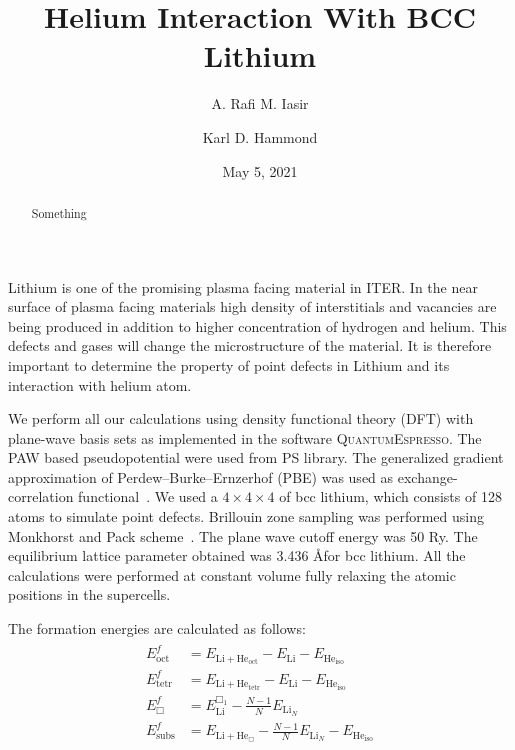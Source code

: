 \documentclass[aps,prl,amsmath,amssymb,reprint]{revtex4-1}
\begin{document}
\title{Helium Interaction With BCC Lithium}
\author{A. Rafi M. Iasir}
\author{Karl D. Hammond}
\date{May 5, 2021}

\begin{abstract}
Something
\end{abstract}


\maketitle
Lithium is one of the promising plasma facing material in ITER. In the near surface of plasma facing materials high density of interstitials and vacancies are being produced in addition to higher concentration of hydrogen and helium. This defects and gases will change the microstructure of the material. It is therefore important to determine the property of point defects in Lithium and its interaction with helium atom.

We perform all our calculations using density functional theory (DFT) with plane-wave basis sets as implemented in the software \textsc{QuantumEspresso}\cite{}. The PAW based pseudopotential were used from PS library. The generalized gradient approximation of Perdew--Burke--Ernzerhof (PBE) was used as exchange-correlation functional~\cite{}. We used a $4\times4\times4$ of bcc lithium, which consists of 128 atoms to simulate point defects. Brillouin zone sampling was performed using Monkhorst and Pack scheme~\cite{}. The plane wave cutoff energy was 50 Ry. The equilibrium lattice parameter obtained was 3.436 \AA\@ for bcc lithium. All the calculations were performed at constant volume fully relaxing the atomic positions in the supercells.

The formation energies are calculated as follows:
\begin{align}\label{eq_forme}
\begin{split}
 E^{f}_{\text{oct}} & = E_{\text{Li}+\text{He}_{\text{oct}}} - E_{\text{Li}} - E_{\text{He}_{\text{iso}}} \\
 E^{f}_{\text{tetr}}& = E_{\text{Li}+\text{He}_{\text{tetr}}} - E_{\text{Li}} - E_{\text{He}_{\text{iso}}} \\
 E^f_{\Box} & = E^{{\Box}_1}_{\text{Li}} - \frac{N-1}{N} E_{\text{Li}_N} \\
 E^f_{\text{subs}} & = E_{\text{Li}+\text{He}_{\Box}} - \frac{N-1}{N} E_{\text{Li}_N} - E_{\text{He}_{\text{iso}}}
\end{split}
 \end{align}
\end{document}
